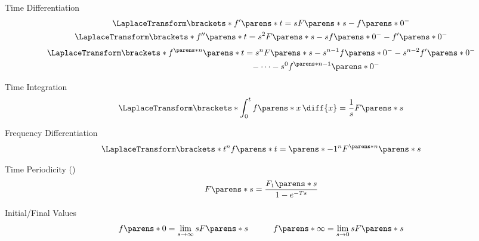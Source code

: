 \begin{multicols}{2}
\begin{CheatsheetEntryFrameStart}
\begin{center}
            Time Differentiation
            \begin{gather*}
                \LaplaceTransform\brackets*{f'\parens*{t}}
                = s F\parens*{s} - f\parens*{0^-}
                \\
                \LaplaceTransform\brackets*{f''\parens*{t}}
                = s^2 F\parens*{s} - s f\parens*{0^-} - f'\parens*{0^-}
            \end{gather*}
            \begin{align*}
                \LaplaceTransform\brackets*{f^{\parens*{n}}\parens*{t}}
                &= s^n F\parens*{s}
                - s^{n-1} f\parens*{0^-}
                - s^{n-2} f'\parens*{0^-}
                \\
                &\phantom{=} - \cdots
                - s^0 f^{\parens*{n-1}}\parens*{0^-}
            \end{align*}

            Time Integration
            \begin{gather*}
                \LaplaceTransform\brackets*{\int_0^t f\parens*{x} \,\diff{x}}
                = \frac{1}{s} F\parens*{s}
            \end{gather*}

            Frequency Differentiation
            \begin{gather*}
                \LaplaceTransform\brackets*{t^n f\parens*{t}}
                = \parens*{-1}^n F^{\parens*{n}}\parens*{s}
            \end{gather*}
        \end{center}

    \end{CheatsheetEntryFrameStart}

    \begin{CheatsheetEntryFrameEnd}

        \begin{center}
            Time Periodicity ()
            \begin{gather*}
                F\parens*{s}
                = \frac{F_1\parens*{s}}{1 - e^{-T s}}
            \end{gather*}

            Initial/Final Values
            \begin{gather*}
                f\parens*{0}
                = \lim_{s \to \infty} s F\parens*{s}
                \qquad\quad
                f\parens*{\infty}
                = \lim_{s \to 0} s F\parens*{s}
            \end{gather*}


\end{center}
\end{CheatsheetEntryFrameEnd}
\end{multicols}
